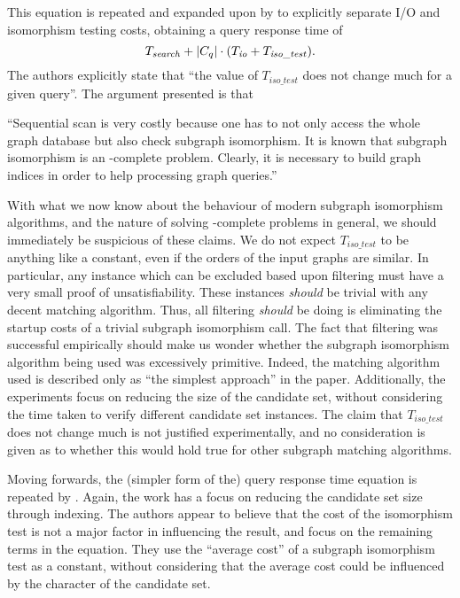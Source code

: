 \documentclass[twoside,11pt]{article}
\newcommand{\citet}[1]{\citeA{#1}}
\begin{document}
This equation is repeated and expanded upon by \citet{DBLP:journals/tods/YanYH05} to explicitly
separate I/O and isomorphism testing costs, obtaining a query response time of \[
    T_{\mathit{search}} + \left|C_q\right| \cdot (T_{\mathit{io}} + T_{\mathit{iso\_test}})
    \textnormal{.} \] The authors explicitly state that ``the value of $T_{\mathit{iso\_test}}$ does
not change much for a given query''. The argument presented is that
\begin{displayquote}``Sequential scan is very costly
because one has to not only access the whole graph database but also check subgraph isomorphism. It
is known that subgraph isomorphism is an \NP-complete problem. Clearly, it is necessary to build
graph indices in order to help processing graph queries.''\end{displayquote}

With what we now know about the behaviour of modern subgraph isomorphism algorithms, and the nature
of solving \NP-complete problems in general, we should immediately be suspicious of these claims. We
do not expect $T_{\mathit{iso\_test}}$ to be anything like a constant, even if the orders of the
input graphs are similar. In particular, any instance which can be excluded based upon filtering
must have a very small proof of unsatisfiability. These instances \emph{should} be trivial with any
decent matching algorithm. Thus, all filtering \emph{should} be doing is eliminating the startup
costs of a trivial subgraph isomorphism call. The fact that filtering was successful empirically
should make us wonder whether the subgraph isomorphism algorithm being used was excessively
primitive. Indeed, the matching algorithm used is described only as ``the simplest approach'' in the
paper.  Additionally, the experiments focus on reducing the size of the candidate set, without
considering the time taken to verify different candidate set instances.  The claim that
$T_{\mathit{iso\_test}}$ does not change much is not justified experimentally, and no consideration
is given as to whether this would hold true for other subgraph matching algorithms.

Moving forwards, the (simpler form of the) query response time equation is repeated by
\citet{DBLP:conf/vldb/ZhaoYY07}. Again, the work has a focus on reducing the candidate set size
through indexing. The authors appear to believe that the cost of the isomorphism test is not a major
factor in influencing the result, and focus on the remaining terms in the equation. They use the
``average cost'' of a subgraph isomorphism test as a constant, without considering that the average
cost could be influenced by the character of the candidate set.
\end{document}
